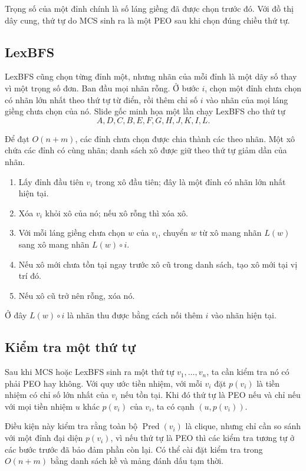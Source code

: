 \documentclass[11pt]{article}
\begin{document}
Trọng số của một đỉnh chính là số láng giềng đã được chọn trước đó. Với đồ thị
dây cung, thứ tự do MCS sinh ra là một PEO sau khi chọn đúng chiều thứ tự.

\subsection{LexBFS}

LexBFS cũng chọn từng đỉnh một, nhưng nhãn của mỗi đỉnh là một dãy số thay vì
một trọng số đơn. Ban đầu mọi nhãn rỗng. Ở bước $i$, chọn một đỉnh chưa chọn
có nhãn lớn nhất theo thứ tự từ điển, rồi thêm chỉ số $i$ vào nhãn của mọi
láng giềng chưa chọn của nó. Slide gốc minh họa một lần chạy LexBFS cho thứ
tự
\[
  A,D,C,B,E,F,G,H,J,K,I,L.
\]

Để đạt $O(n+m)$, các đỉnh chưa chọn được chia thành các  theo nhãn.
Một xô chứa các đỉnh có cùng nhãn; danh sách xô được giữ theo thứ tự giảm dần
của nhãn.
\begin{enumerate}
  \item Lấy đỉnh đầu tiên $v_i$ trong xô đầu tiên; đây là một đỉnh có nhãn lớn
  nhất hiện tại.
  \item Xóa $v_i$ khỏi xô của nó; nếu xô rỗng thì xóa xô.
  \item Với mỗi láng giềng chưa chọn $w$ của $v_i$, chuyển $w$ từ xô mang
  nhãn $L(w)$ sang xô mang nhãn $L(w)\circ i$.
  \item Nếu xô mới chưa tồn tại ngay trước xô cũ trong danh sách, tạo xô mới
  tại vị trí đó.
  \item Nếu xô cũ trở nên rỗng, xóa nó.
\end{enumerate}
Ở đây $L(w)\circ i$ là nhãn thu được bằng cách nối thêm $i$ vào nhãn hiện tại.

\subsection{Kiểm tra một thứ tự}

Sau khi MCS hoặc LexBFS sinh ra một thứ tự $v_1,\ldots,v_n$, ta cần kiểm tra
nó có phải PEO hay không. Với quy ước tiền nhiệm, với mỗi $v_i$ đặt $p(v_i)$
là tiền nhiệm có chỉ số lớn nhất của $v_i$ nếu tồn tại. Khi đó thứ tự là PEO
nếu và chỉ nếu với mọi tiền nhiệm $u$ khác $p(v_i)$ của $v_i$, ta có cạnh
$(u,p(v_i))$.

Điều kiện này kiểm tra rằng toàn bộ $\operatorname{Pred}(v_i)$ là clique,
nhưng chỉ cần so sánh với một đỉnh đại diện $p(v_i)$, vì nếu thứ tự là PEO thì
các kiểm tra tương tự ở các bước trước đã bảo đảm phần còn lại. Có thể cài đặt
kiểm tra trong $O(n+m)$ bằng danh sách kề và mảng đánh dấu tạm thời.
\end{document}
